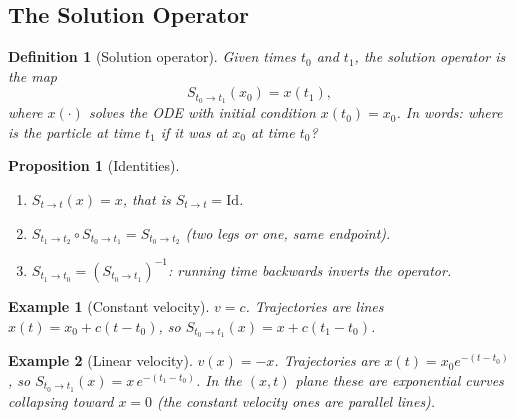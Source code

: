 \documentclass{article}
\newtheorem{definition}{Definition}
\newtheorem*{example}{Example}
\newtheorem{proposition}{Proposition}
\begin{document}
\subsection{The Solution Operator}
\begin{definition}[Solution operator]
    Given times $t_0$ and $t_1$, the solution operator is the map
    \begin{equation}
        S_{t_0 \to t_1}(x_0) = x(t_1),
    \end{equation}
    where $x(\cdot)$ solves the ODE with initial condition $x(t_0) = x_0$. In words: where is the particle at time $t_1$ if it was at $x_0$ at time $t_0$?
\end{definition}
\begin{proposition}[Identities]
    \begin{enumerate}
        \item $S_{t \to t}(x) = x$, that is $S_{t \to t} = \mathrm{Id}$.
        \item $S_{t_1 \to t_2} \circ S_{t_0 \to t_1} = S_{t_0 \to t_2}$ (two legs or one, same endpoint).
        \item $S_{t_1 \to t_0} = \left( S_{t_0 \to t_1} \right)^{-1}$: running time backwards inverts the operator.
    \end{enumerate}
\end{proposition}
\begin{example}[Constant velocity]
    $v = c$. Trajectories are lines $x(t) = x_0 + c(t - t_0)$, so $S_{t_0\to t_1}(x) = x + c(t_1 - t_0)$.
\end{example}
\begin{example}[Linear velocity]
    $v(x) = -x$. Trajectories are $x(t) = x_0 e^{-(t-t_0)}$, so $S_{t_0\to t_1}(x) = x\,e^{-(t_1-t_0)}$. In the $(x,t)$ plane these are exponential curves collapsing toward $x = 0$ (the constant velocity ones are parallel lines).
\end{example}
\end{document}
